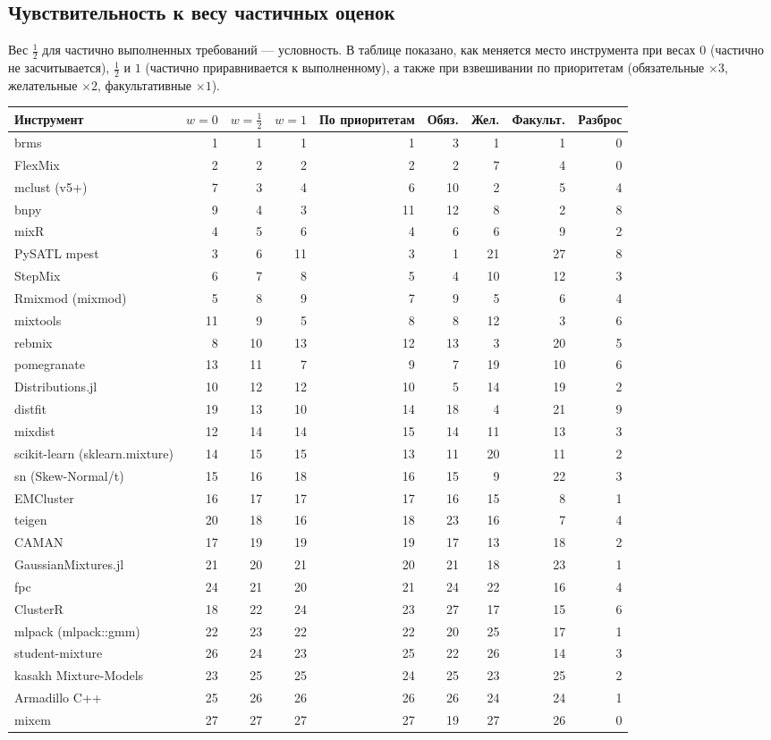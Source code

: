 \documentclass[10pt,a4paper]{article}
\begin{document}
\subsection{Чувствительность к весу частичных оценок}
Вес $\tfrac12$ для частично выполненных требований --- условность. В таблице показано, как меняется место инструмента при весах $0$ (частично не засчитывается),
$\tfrac12$ и $1$ (частично приравнивается к выполненному), а также при взвешивании по приоритетам (обязательные $\times 3$, желательные $\times 2$, факультативные $\times 1$).
{\footnotesize
\begin{longtable}{@{}l r r r r r r r r@{}}
\toprule
Инструмент & $w{=}0$ & $w{=}\tfrac12$ & $w{=}1$ & По приоритетам & Обяз. & Жел. & Факульт. & Разброс \\
\midrule
\endhead
brms & 1 & 1 & 1 & 1 & 3 & 1 & 1 & 0 \\
FlexMix & 2 & 2 & 2 & 2 & 2 & 7 & 4 & 0 \\
mclust (v5+) & 7 & 3 & 4 & 6 & 10 & 2 & 5 & 4 \\
bnpy & 9 & 4 & 3 & 11 & 12 & 8 & 2 & 8 \\
mixR & 4 & 5 & 6 & 4 & 6 & 6 & 9 & 2 \\
PySATL mpest & 3 & 6 & 11 & 3 & 1 & 21 & 27 & 8 \\
StepMix & 6 & 7 & 8 & 5 & 4 & 10 & 12 & 3 \\
Rmixmod (mixmod) & 5 & 8 & 9 & 7 & 9 & 5 & 6 & 4 \\
mixtools & 11 & 9 & 5 & 8 & 8 & 12 & 3 & 6 \\
rebmix & 8 & 10 & 13 & 12 & 13 & 3 & 20 & 5 \\
pomegranate & 13 & 11 & 7 & 9 & 7 & 19 & 10 & 6 \\
Distributions.jl & 10 & 12 & 12 & 10 & 5 & 14 & 19 & 2 \\
distfit & 19 & 13 & 10 & 14 & 18 & 4 & 21 & 9 \\
mixdist & 12 & 14 & 14 & 15 & 14 & 11 & 13 & 3 \\
scikit-learn (sklearn.mixture) & 14 & 15 & 15 & 13 & 11 & 20 & 11 & 2 \\
sn (Skew-Normal/t) & 15 & 16 & 18 & 16 & 15 & 9 & 22 & 3 \\
EMCluster & 16 & 17 & 17 & 17 & 16 & 15 & 8 & 1 \\
teigen & 20 & 18 & 16 & 18 & 23 & 16 & 7 & 4 \\
CAMAN & 17 & 19 & 19 & 19 & 17 & 13 & 18 & 2 \\
GaussianMixtures.jl & 21 & 20 & 21 & 20 & 21 & 18 & 23 & 1 \\
fpc & 24 & 21 & 20 & 21 & 24 & 22 & 16 & 4 \\
ClusterR & 18 & 22 & 24 & 23 & 27 & 17 & 15 & 6 \\
mlpack (mlpack::gmm) & 22 & 23 & 22 & 22 & 20 & 25 & 17 & 1 \\
student-mixture & 26 & 24 & 23 & 25 & 22 & 26 & 14 & 3 \\
kasakh Mixture-Models & 23 & 25 & 25 & 24 & 25 & 23 & 25 & 2 \\
Armadillo C++ & 25 & 26 & 26 & 26 & 26 & 24 & 24 & 1 \\
mixem & 27 & 27 & 27 & 27 & 19 & 27 & 26 & 0 \\
\bottomrule
\end{longtable}}
\end{document}
